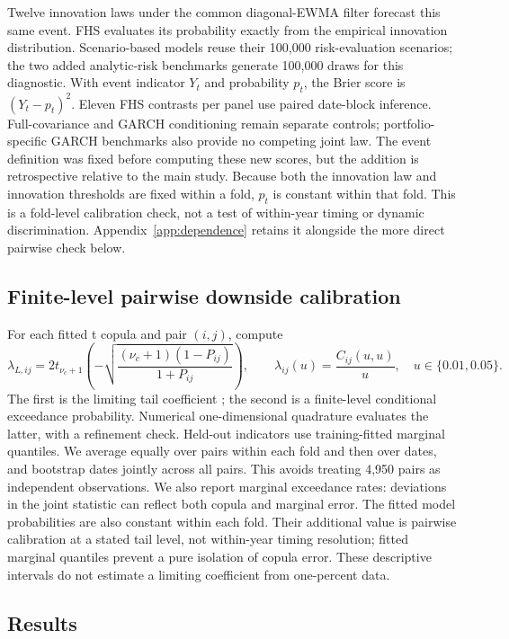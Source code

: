 \documentclass[11pt]{article}
\theoremstyle{definition}\newtheorem{definition}[theorem]{Definition}
\theoremstyle{remark}\newtheorem{remark}[theorem]{Remark}
\begin{document}
Twelve innovation laws under the common diagonal-EWMA filter forecast this same event. FHS evaluates its probability exactly from the empirical innovation distribution. Scenario-based models reuse their 100,000 risk-evaluation scenarios; the two added analytic-risk benchmarks generate 100,000 draws for this diagnostic. With event indicator $Y_t$ and probability $p_t$, the Brier score is $(Y_t-p_t)^2$. Eleven FHS contrasts per panel use paired date-block inference. Full-covariance and GARCH conditioning remain separate controls; portfolio-specific GARCH benchmarks also provide no competing joint law. The event definition was fixed before computing these new scores, but the addition is retrospective relative to the main study. Because both the innovation law and innovation thresholds are fixed within a fold, $p_t$ is constant within that fold. This is a fold-level calibration check, not a test of within-year timing or dynamic discrimination. Appendix~\ref{app:dependence} retains it alongside the more direct pairwise check below.

\subsection{Finite-level pairwise downside calibration}\label{sec:pair-tail}
For each fitted t copula and pair $(i,j)$, compute
\[
\lambda_{L,ij}=2t_{\nu_c+1}\!\left(-\sqrt{\frac{(\nu_c+1)(1-P_{ij})}{1+P_{ij}}}\right),\qquad
\lambda_{ij}(u)=\frac{C_{ij}(u,u)}u,\quad u\in\{0.01,0.05\}.
\]
The first is the limiting tail coefficient \citep{demarta2005tcopula}; the second is a finite-level conditional exceedance probability. Numerical one-dimensional quadrature evaluates the latter, with a refinement check. Held-out indicators use training-fitted marginal quantiles. We average equally over pairs within each fold and then over dates, and bootstrap dates jointly across all pairs. This avoids treating 4,950 pairs as independent observations. We also report marginal exceedance rates: deviations in the joint statistic can reflect both copula and marginal error. The fitted model probabilities are also constant within each fold. Their additional value is pairwise calibration at a stated tail level, not within-year timing resolution; fitted marginal quantiles prevent a pure isolation of copula error. These descriptive intervals do not estimate a limiting coefficient from one-percent data.


\subsection{Results}\label{sec:control-results}
\end{document}
